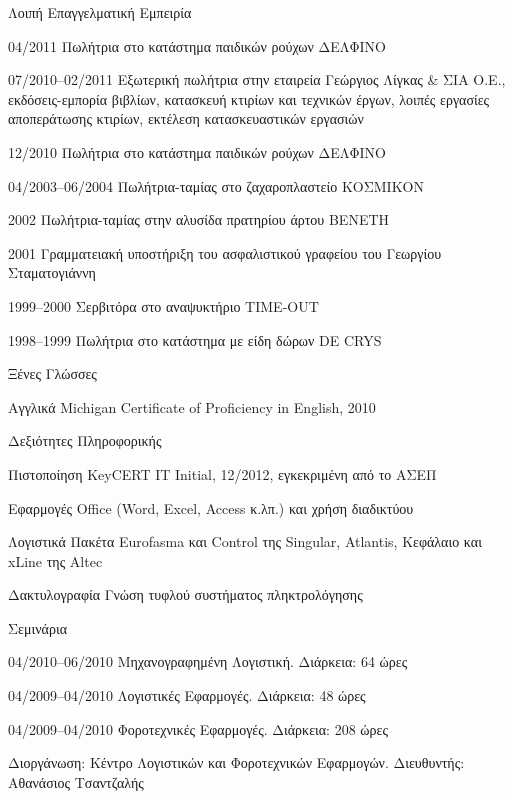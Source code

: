\documentclass[a4paper]{article}
\begin{document}
\begin{cv}{}
\begin{cvlist}{Λοιπή Επαγγελματική Εμπειρία}
  \item[04/2011] Πωλήτρια στο κατάστημα παιδικών ρούχων
                 \textsf{ΔΕΛΦΙΝΟ}
  \item[07/2010–02/2011] Εξωτερική πωλήτρια στην εταιρεία
                         \textsf{Γεώργιος Λίγκας \& ΣΙΑ
                         Ο.Ε.}, {εκδόσεις}-εμπορία βιβλίων,
                         κατασκευή κτιρίων και τεχνικών
                         έργων, λοιπές εργασίες αποπεράτωσης
                         κτιρίων, εκτέλεση κατασκευαστικών
                         εργασιών
  \item[12/2010] Πωλήτρια στο κατάστημα παιδικών ρούχων
                 \textsf{ΔΕΛΦΙΝΟ}
  \item[04/2003–06/2004] Πωλήτρια-ταμίας στο ζαχαροπλαστείο
                         \textsf{ΚΟΣΜΙΚΟΝ}
  \item[2002] Πωλήτρια-ταμίας στην αλυσίδα πρατηρίου άρτου
              \textsf{ΒΕΝΕΤΗ}
  \item[2001] Γραμματειακή υποστήριξη του ασφαλιστικού
              γραφείου του \textsf{Γεωργίου Σταματογιάννη}
  \item[1999–2000] Σερβιτόρα στο αναψυκτήριο
                   \textsf{TIME-OUT}
  \item[1998–1999] Πωλήτρια στο κατάστημα με είδη δώρων
                   \textsf{DE CRYS}
\end{cvlist}

\begin{cvlist}{Ξένες Γλώσσες}
  \item[Αγγλικά] Michigan Certificate of Proficiency in
                 English, 2010
\end{cvlist}

\begin{cvlist}{Δεξιότητες Πληροφορικής}
  \item[Πιστοποίηση] KeyCERT IT Initial, 12/2012,
                     εγκεκριμένη από το ΑΣΕΠ
  \item[Εφαρμογές] Office (Word, Excel, Access κ.λπ.) και
                   χρήση διαδικτύου
  \item[Λογιστικά] Πακέτα Eurofasma και Control της
                   Singular, Atlantis, Κεφάλαιο και xLine
                   της Altec
  \item[Δακτυλογραφία] Γνώση τυφλού συστήματος
                       πληκτρολόγησης
\end{cvlist}

\begin{cvlist}{Σεμινάρια}
  \item[04/2010–06/2010] \textsf{Μηχανογραφημένη Λογιστική.}
                         Διάρκεια: 64 ώρες
  \item[04/2009–04/2010] \textsf{Λογιστικές Εφαρμογές.}
                         Διάρκεια: 48 ώρες
  \item[04/2009–04/2010] \textsf{Φοροτεχνικές Εφαρμογές.}
                         Διάρκεια: 208 ώρες
  \item[Διοργάνωση:] Κέντρο Λογιστικών και Φοροτεχνικών
                     Εφαρμογών. Διευθυντής: Αθανάσιος
                     Τσαντζαλής
\end{cvlist}


\end{cv}
\end{document}

